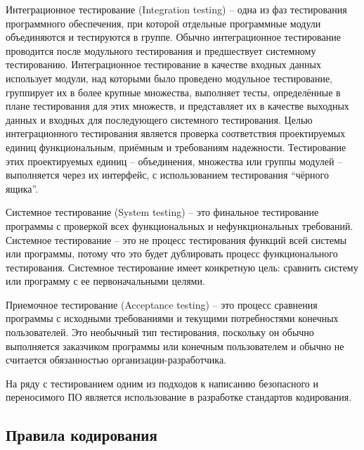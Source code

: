 Интеграционное тестирование (Integration testing) -- одна из фаз тестирования программного обеспечения, при которой отдельные программные модули объединяются и тестируются в группе. 
Обычно интеграционное тестирование проводится после модульного тестирования и предшествует системному тестированию. Интеграционное тестирование в качестве входных данных использует модули, над которыми было проведено модульное тестирование, группирует их в более крупные множества, выполняет тесты, определённые в плане тестирования для этих множеств, и представляет их в качестве выходных данных и входных для последующего системного тестирования.
Целью интеграционного тестирования является проверка соответствия проектируемых единиц функциональным, приёмным и требованиям надежности. Тестирование этих проектируемых единиц -- объединения, множества или группы модулей -- выполняется через их интерфейс, с использованием тестирования ``чёрного ящика''.

Системное тестирование (System testing) -- это финальное тестирование программы с проверкой всех функциональных и 
нефункциональных требований. Системное тестирование -- это не процесс тестирования функций всей системы или 
программы, потому что это будет дублировать процесс функционального тестирования. Системное 
тестирование имеет конкретную цель: сравнить систему или программу с ее первоначальными 
целями.

Приемочное тестирование (Acceptance testing) -- это процесс сравнения программы с исходными требованиями 
и текущими потребностями конечных пользователей. Это необычный тип тестирования, поскольку он обычно 
выполняется заказчиком программы или конечным пользователем и обычно не считается обязанностью 
организации-разработчика.

На ряду с тестированием одним из подходов к написанию безопасного и переносимого ПО 
является использование в разработке стандартов кодирования. 

\subsection{Правила кодирования}

